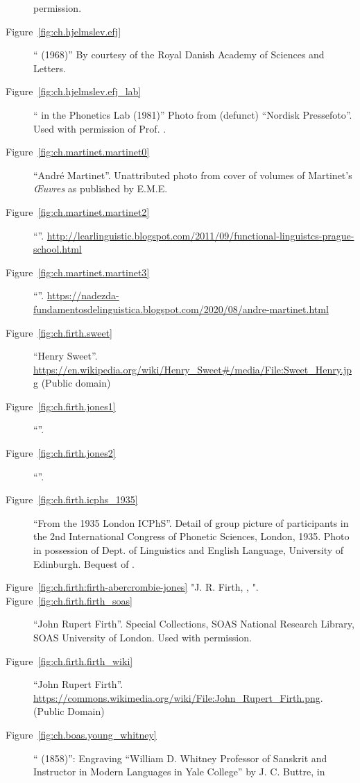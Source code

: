 \begin{description}
  permission.
\item[Figure~\ref{fig:ch.hjelmslev.efj}] ``
  (1968)'' By courtesy of the Royal Danish Academy of Sciences and
  Letters.
\item[Figure~\ref{fig:ch.hjelmslev.efj_lab}] ``
  in the Phonetics Lab (1981)'' Photo from (defunct) ``Nordisk
  Pressefoto''. Used with permission of Prof. .
\item[Figure~\ref{fig:ch.martinet.martinet0}] ``André
  Martinet''. Unattributed photo from cover of volumes of Martinet's
  \textsl{Œuvres} as published by E.M.E.
\item[Figure~\ref{fig:ch.martinet.martinet2}] ``''.
  \url{http://learlinguistic.blogspot.com/2011/09/functional-linguistcs-prague-school.html}
\item[Figure~\ref{fig:ch.martinet.martinet3}] ``''.
  \url{https://nadezda-fundamentosdelinguistica.blogspot.com/2020/08/andre-martinet.html} 
\item[Figure~\ref{fig:ch.firth.sweet}] ``Henry
  Sweet''. \url{https://en.wikipedia.org/wiki/Henry_Sweet#/media/File:Sweet_Henry.jpg}
  (Public domain)
\item[Figure~\ref{fig:ch.firth.jones1}] ``''. 
\item[Figure~\ref{fig:ch.firth.jones2}] ``''.
\item[Figure~\ref{fig:ch.firth.icphs_1935}] ``From the 1935 London
  ICPhS''. Detail of group picture of participants in the 2nd
  International Congress of Phonetic Sciences, London, 1935. Photo in
  possession of Dept. of Linguistics and English Language, University
  of Edinburgh. Bequest of .
\item[Figure~\ref{fig:ch.firth:firth-abercrombie-jones} "J. R. Firth, \name{David}{Abercrombie}, \name{Daniel}{Jones}".] 
\item[Figure~\ref{fig:ch.firth.firth_soas}] ``John Rupert
  Firth''. Special Collections, SOAS National Research Library, SOAS
  University of London. Used with permission.
\item[Figure~\ref{fig:ch.firth.firth_wiki}] ``John Rupert
  Firth''. \url{https://commons.wikimedia.org/wiki/File:John_Rupert_Firth.png}. (Public
  Domain) 
\item[Figure~\ref{fig:ch.boas.young_whitney}] ``
  (1858)'': Engraving ``William D. Whitney Professor of Sanskrit and
  Instructor in Modern Languages in Yale College'' by J. C. Buttre, in

\end{description}
